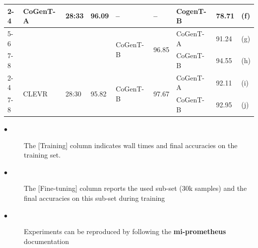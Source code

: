\documentclass[final,paperwidth=36in,paperheight=48in,portrait,fontscale=0.36]{baposter}
\begin{document}
\begin{poster}
{\begin{table}[H]
{\begin{tabular}{lllllllll}
		\cmidrule{2-4} \cmidrule{5-6} \cmidrule{7-8} 
		& \multirow{4}{*}{CoGenT-A}   & \multirow{4}{*}{28:33}   & \multirow{4}{*}{96.09}  &  \multirow{1}{*}{--}  &  \multirow{1}{*}{--}   & CogenT-B & 78.71        & (f)  \\
		\cmidrule{5-6} \cmidrule{7-8} 
		&                             &                                         &    &   \multirow{2}{*}{CoGenT-B}         &       \multirow{2}{*}{96.85}          & CoGenT-A &  91.24        & (g) \\
		\cmidrule{7-8} 
		&                             &                                         &       &         &                & CoGenT-B &    94.55     & (h)  \\
		
		\cmidrule{2-4} \cmidrule{5-6} \cmidrule{7-8} 
		& \multirow{2}{*}{CLEVR}  & \multirow{2}{*}{28:30}  & \multirow{2}{*}{95.82} &   \multirow{2}{*}{CoGenT-B}         &       \multirow{2}{*}{97.67}          & CoGenT-A &  92.11       & (i) \\
		\cmidrule{7-8} 
		&                             &                                         &       &         &                & CoGenT-B &    92.95    & (j)  \\  		
		
		
		\bottomrule
		
	
	\end{tabular}}
	\label{tab:data_properties}
\end{table}


\begin{description}
	\item[$\bullet$] The [Training] column indicates wall times and final accuracies on the training set.
	\item[$\bullet$] The [Fine-tuning] column reports the used sub-set (30k samples) and the final accuracies on this sub-set during training
	\item[$\bullet$] Experiments can be reproduced by following the \textbf{mi-prometheus}  documentation
\end{description}

}



\end{poster}
\end{document}
